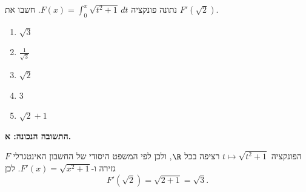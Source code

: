 
\begin{question}
נתונה פונקציה $F(x)=\int_0^x\sqrt{t^2+1}\,dt$. חשבו את $F'(\sqrt2)$.
\begin{enumerate}
  \item $\sqrt3$
  \item $\frac{1}{\sqrt3}$
  \item $\sqrt2$
  \item $3$
  \item $\sqrt2+1$
\end{enumerate}
\end{question}

\begin{solution}
\textbf{התשובה הנכונה: א.}

הפונקציה $t\mapsto\sqrt{t^2+1}$ רציפה בכל $\R$, ולכן לפי המשפט היסודי של החשבון האינטגרלי $F$ גזירה ו-$F'(x)=\sqrt{x^2+1}$. לכן
\[ F'(\sqrt2)=\sqrt{2+1}=\sqrt3 . \]
\end{solution}
